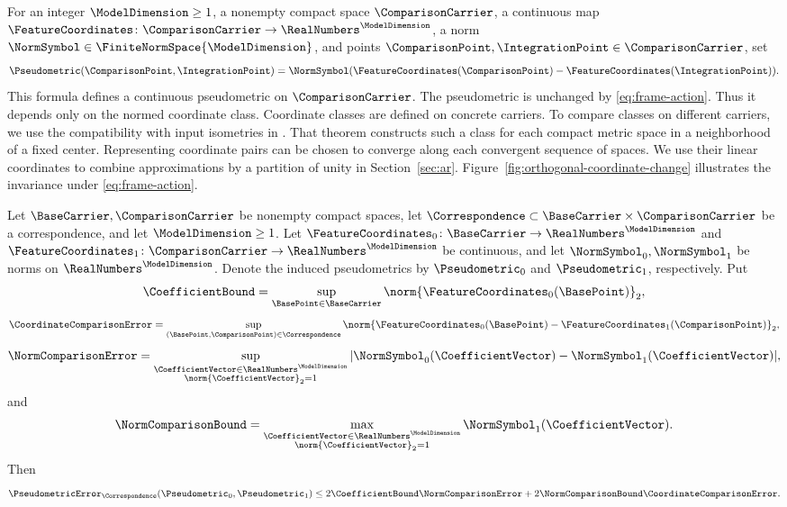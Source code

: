For an integer
$\ModelDimension\geq1$,
a nonempty compact space
$\ComparisonCarrier$,
a continuous map
$\FeatureCoordinates\colon\ComparisonCarrier\to\RealNumbers^\ModelDimension$,
a norm
$\NormSymbol\in\FiniteNormSpace{\ModelDimension}$,
and points
$\ComparisonPoint,\IntegrationPoint\in\ComparisonCarrier$,
set
\[
 \Pseudometric(\ComparisonPoint,\IntegrationPoint)
 =\NormSymbol(\FeatureCoordinates(\ComparisonPoint)-\FeatureCoordinates(\IntegrationPoint)).
\]
This formula defines a continuous pseudometric on
$\ComparisonCarrier$.
The pseudometric is unchanged by \eqref{eq:frame-action}.
Thus it depends only on the normed coordinate class.
Coordinate classes are defined on concrete carriers.
To compare classes on different carriers,
we use the compatibility with input isometries in .
That theorem constructs such a class for each compact metric space
in a neighborhood of a fixed center.
Representing coordinate pairs can be chosen to converge along each convergent sequence of spaces.
We use their linear coordinates to combine approximations by a partition of unity
in Section~\ref{sec:ar}.
Figure~\ref{fig:orthogonal-coordinate-change} illustrates the invariance
under \eqref{eq:frame-action}.



\begin{lemma}\label{lem:coordinate-pseudometric-estimate}
Let
$\BaseCarrier,\ComparisonCarrier$
be nonempty compact spaces,
let
$\Correspondence\subset\BaseCarrier\times\ComparisonCarrier$
be a correspondence,
and let
$\ModelDimension\geq1$.
Let
$\FeatureCoordinates_0\colon\BaseCarrier\to\RealNumbers^\ModelDimension$
and
$\FeatureCoordinates_1\colon\ComparisonCarrier\to\RealNumbers^\ModelDimension$
be continuous,
and let
$\NormSymbol_0,\NormSymbol_1$
be norms on
$\RealNumbers^\ModelDimension$.
Denote the induced pseudometrics by
$\Pseudometric_0$
and
$\Pseudometric_1$,
respectively.
Put
\[
 \CoefficientBound=\sup_{\BasePoint\in\BaseCarrier}
       \norm{\FeatureCoordinates_0(\BasePoint)}_2,
\]
\[
 \CoordinateComparisonError
 =\sup_{(\BasePoint,\ComparisonPoint)\in\Correspondence}
       \norm{\FeatureCoordinates_0(\BasePoint)-\FeatureCoordinates_1(\ComparisonPoint)}_2,
\]
\[
 \NormComparisonError
 =\sup_{\substack{\CoefficientVector\in\RealNumbers^\ModelDimension\\\norm{\CoefficientVector}_2=1}}
       |\NormSymbol_0(\CoefficientVector)-\NormSymbol_1(\CoefficientVector)|,
\]
and
\[
 \NormComparisonBound
 =\max_{\substack{\CoefficientVector\in\RealNumbers^\ModelDimension\\\norm{\CoefficientVector}_2=1}}\NormSymbol_1(\CoefficientVector).
\]
Then
\begin{equation}\label{eq:coordinate-pseudometric-estimate}
 \PseudometricError_\Correspondence(\Pseudometric_0,\Pseudometric_1)
 \leq2\CoefficientBound\NormComparisonError
       +2\NormComparisonBound\CoordinateComparisonError.
\end{equation}
\end{lemma}

